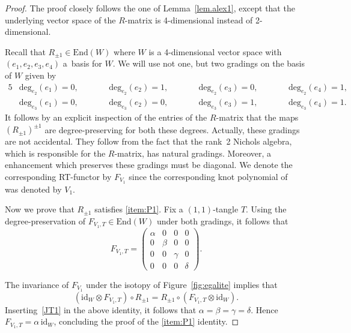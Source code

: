 \documentclass[pdftex]{sigma}
\numberwithin{equation}{section}
\theoremstyle{definition}
\begin{document}
\begin{proof}
The proof closely follows the one of Lemma~\ref{lem.alex1}, except that the
underlying vector space of the $R$-matrix is 4-dimensional instead of
2-dimensional.

Recall that $R_{\pm1} \in \mathrm{End}(W)$ where $W$ is a 4-dimensional vector space with
$(e_1,e_2,e_3,e_4)$ a~basis for $W$. We will use not one, but two
gradings on the basis of $W$ given by
\begin{alignat*}{5}
& \mathrm{deg}_{e_2}(e_1) = 0, \qquad&& \mathrm{deg}_{e_2}(e_2) = 1, \qquad&&
\mathrm{deg}_{e_2}(e_3) = 0, \qquad&& \mathrm{deg}_{e_2}(e_4) = 1,& \\
& \mathrm{deg}_{e_3}(e_1) = 0, \qquad&& \mathrm{deg}_{e_3}(e_2) = 0, \qquad&&
\mathrm{deg}_{e_3}(e_3) = 1, \qquad&& \mathrm{deg}_{e_3}(e_4) = 1 .&
\end{alignat*}
It follows by an explicit inspection of the entries of the $R$-matrix
that the maps $(R_{\pm 1})^{\pm 1}$ are degree-preserving for both these degrees.
Actually, these gradings are not accidental. They follow from the fact that the
rank~2 Nichols algebra, which is responsible for the $R$-matrix, has natural
gradings. Moreover, a enhancement which preserves these gradings must be diagonal.
We denote the corresponding RT-functor by $F_{V_1}$ since the corresponding knot
polynomial of~\cite{GK:multi} was denoted by $V_1$.

Now we prove that $R_{\pm 1}$ satisfies \eqref{item:P1}. Fix a $(1,1)$-tangle $T$.
Using the degree-preservation of $F_{V_1,T} \in \mathrm{End}(W)$ under both gradings,
it follows that
\begin{equation}
\label{JT1}
F_{V_1,T} = \begin{pmatrix}
\alpha & 0 & 0 & 0 \\
0 & \beta & 0 & 0 \\
0 & 0 & \gamma & 0 \\
0 & 0 & 0 & \delta
\end{pmatrix} .
\end{equation}

The invariance of $F_{V_1}$ under the isotopy of
Figure~\ref{fig:egalite} implies that
\begin{equation*}
(\mathrm{id}_W \otimes F_{V_1,T}) \circ R_{\pm 1} =
R_{\pm 1} \circ (F_{V_1,T} \otimes \mathrm{id}_W) .
\end{equation*}
Inserting~\eqref{JT1} in the above identity, it follows that
$\alpha = \beta = \gamma = \delta$. Hence
$F_{V_1,T} = \alpha\,\mathrm{id}_W$, concluding the proof of the \eqref{item:P1}
identity.


\end{proof}
\end{document}
